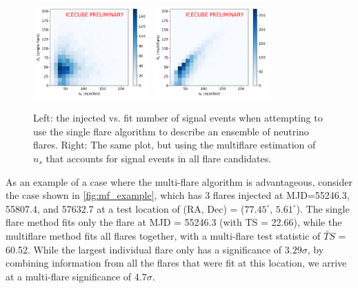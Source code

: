 \begin{figure}[h]
\centering
\includegraphics[width=0.4\textwidth]{figs/500px-Ns_singleflare.png}
\includegraphics[width=0.4\textwidth]{figs/500px-Ns_multiflare.png}
\caption{Left: the injected vs. fit number of signal events when attempting to use the single flare algorithm to describe an ensemble of neutrino flares. Right: The same plot, but using the multiflare estimation of $n_s$ that accounts for signal events in all flare candidates.}
\label{fig:persrc_nsfit}
\end{figure}

As an example of a case where the multi-flare algorithm is advantageous, consider the case shown in \ref{fig:mf_example}, which has 3 flares injected at MJD=55246.3, 55807.4, and 57632.7 at a test location of (RA, Dec) = ($77.45^{\circ}$, $5.61^{\circ}$). The single flare method fits only the flare at MJD = 55246.3 (with TS = 22.66), while the multiflare method fits all flares together, with a multi-flare test statistic of $\widetilde{TS}$ = 60.52. While the largest individual flare only has a significance of $3.29 \sigma$, by combining information from all the flares that were fit at this location, we arrive at a multi-flare significance of $4.7 \sigma$. 

